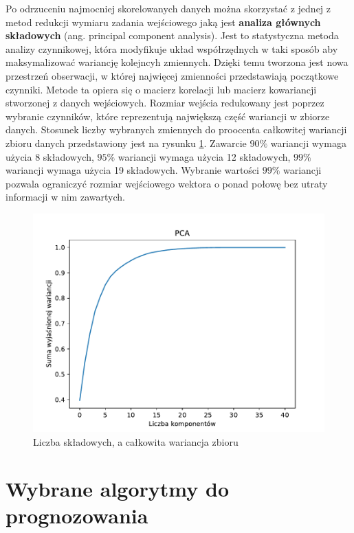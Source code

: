 \documentclass[a4paper, twoside, 11pt, openright]{article}
\begin{document}
Po odrzuceniu najmocniej skorelowanych danych można skorzystać z jednej z metod redukcji wymiaru zadania wejściowego jaką jest \textbf{analiza głównych składowych} (ang. principal component analysis). Jest to statystyczna metoda analizy czynnikowej, która modyfikuje układ współrzędnych w taki sposób aby maksymalizować wariancję kolejncyh zmiennych. Dzięki temu tworzona jest nowa przestrzeń obserwacji, w której najwięcej zmienności przedstawiają początkowe czynniki. Metode ta opiera się o macierz korelacji lub macierz kowariancji stworzonej z danych wejściowych. Rozmiar wejścia redukowany jest poprzez wybranie czynników, które reprezentują największą część wariancji w zbiorze danych. Stosunek liczby wybranych zmiennych do proocenta całkowitej wariancji zbioru danych przedstawiony jest na rysunku \ref{img:pca_variance}. Zawarcie $90\%$ wariancji wymaga użycia 8 składowych,  $95\%$ wariancji wymaga użycia 12 składowych, $99\%$ wariancji wymaga użycia 19 składowych. Wybranie wartości $99\%$ wariancji pozwala ograniczyć rozmiar wejściowego wektora o ponad połowę bez utraty informacji w nim zawartych.

\begin{figure}[H]
\centering 
\includegraphics[scale=0.9]{img/pca_variance.pdf}
\caption{Liczba składowych, a całkowita wariancja zbioru}
\label{img:pca_variance}
\end{figure}

\newpage

\section{Wybrane algorytmy do prognozowania}
\end{document}
